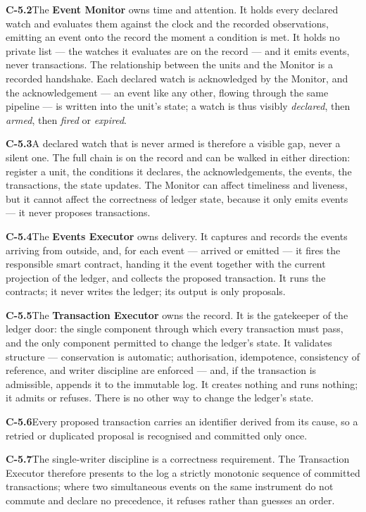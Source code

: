 \documentclass[11pt,a4paper]{article}
\newcommand{\clause}[2]{\par\medskip\noindent\textbf{#1}\hspace{0.6em}#2}
\begin{document}
\clause{C-5.2}{The \textbf{Event Monitor} owns time and attention. It holds every
declared watch and evaluates them against the clock and the recorded observations,
emitting an event onto the record the moment a condition is met. It holds no
private list --- the watches it evaluates are on the record --- and it emits
events, never transactions. The relationship between the units and the Monitor is
a recorded handshake. Each declared watch is acknowledged by the Monitor, and the
acknowledgement --- an event like any other, flowing through the same pipeline ---
is written into the unit's state; a watch is thus visibly \emph{declared}, then
\emph{armed}, then \emph{fired} or \emph{expired}.}

\clause{C-5.3}{A declared watch that is never armed is therefore a visible gap,
never a silent one. The full chain is on the record and can be walked in either
direction: register a unit, the conditions it declares, the acknowledgements, the
events, the transactions, the state updates. The Monitor can affect timeliness and
liveness, but it cannot affect the correctness of ledger state, because it only
emits events --- it never proposes transactions.}

\clause{C-5.4}{The \textbf{Events Executor} owns delivery. It captures and records
the events arriving from outside, and, for each event --- arrived or emitted ---
it fires the responsible smart contract, handing it the event together with the
current projection of the ledger, and collects the proposed transaction. It runs
the contracts; it never writes the ledger; its output is only proposals.}

\clause{C-5.5}{The \textbf{Transaction Executor} owns the record. It is the
gatekeeper of the ledger door: the single component through which every
transaction must pass, and the only component permitted to change the ledger's
state. It validates structure --- conservation is automatic; authorisation,
idempotence, consistency of reference, and writer discipline are enforced --- and,
if the transaction is admissible, appends it to the immutable log. It creates
nothing and runs nothing; it admits or refuses. There is no other way to change
the ledger's state.}

\clause{C-5.6}{Every proposed transaction carries an identifier derived from its
cause, so a retried or duplicated proposal is recognised and committed only once.}

\clause{C-5.7}{The single-writer discipline is a correctness requirement. The
Transaction Executor therefore presents to the log a strictly monotonic sequence
of committed transactions; where two simultaneous events on the same instrument do
not commute and declare no precedence, it refuses rather than guesses an order.}
\end{document}
